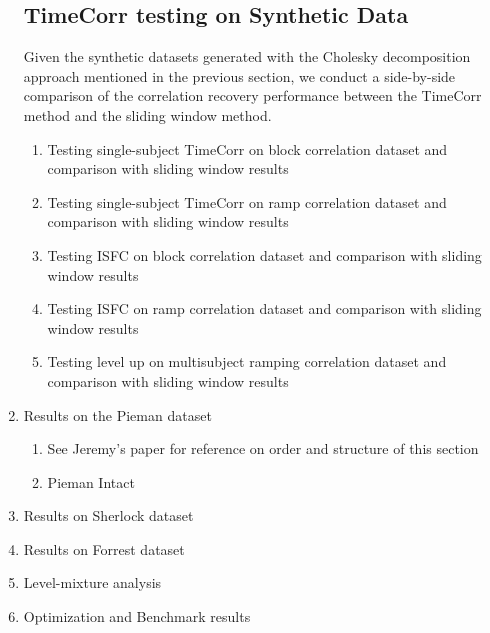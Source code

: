 \documentclass[12pt]{article}
\begin{document}
\begin{enumerate}
\subsection{TimeCorr testing on Synthetic Data}
Given the synthetic datasets generated with the Cholesky decomposition approach mentioned in the previous section, we conduct a side-by-side comparison of the correlation recovery performance between the TimeCorr method and the sliding window method.

\begin{enumerate}
\item Testing single-subject TimeCorr on block correlation dataset and comparison with sliding window results
\item Testing single-subject TimeCorr on ramp correlation dataset and comparison with sliding window results
\item Testing ISFC on block correlation dataset and comparison with sliding window results
\item Testing ISFC on ramp correlation dataset and comparison with sliding window results
\item Testing level up on multisubject ramping correlation dataset and comparison with sliding window results
\end{enumerate}
\item Results on the Pieman dataset
\begin{enumerate}
\item See Jeremy's paper for reference on order and structure of this section

\item Pieman Intact
\end{enumerate}
\item Results on Sherlock dataset
\item Results on Forrest dataset
\item Level-mixture analysis
\item Optimization and Benchmark results

\end{enumerate}
\end{document}
